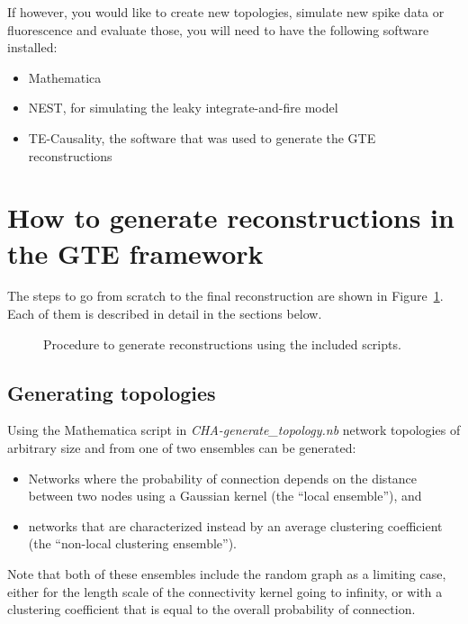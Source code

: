\documentclass[a4paper,11pt]{article}
\begin{document}
If however, you would like to create new topologies, simulate new spike data or fluorescence and evaluate those, you will need to have the following software installed:

\begin{itemize}
  \item Mathematica
  \item NEST, for simulating the leaky integrate-and-fire model~\cite{Gewaltig:NEST}
  \item TE-Causality, the software that was used to generate the GTE reconstructions
\end{itemize}


\section{How to generate reconstructions in the GTE framework}

The steps to go from scratch to the final reconstruction are shown in Figure~\ref{fig:flow_chart_1}. Each of them is described in detail in the sections below.

\begin{figure}
  \begin{center}
    
  \end{center}
  \caption{Procedure to generate reconstructions using the included scripts.}
  \label{fig:flow_chart_1}
\end{figure}


\subsection{Generating topologies}

Using the Mathematica script in \emph{CHA-generate\_topology.nb} network topologies of arbitrary size and from one of two ensembles can be generated:
\begin{itemize}
  \item Networks where the probability of connection depends on the distance between two nodes using a Gaussian kernel (the ``local ensemble''), and
  \item networks that are characterized instead by an average clustering coefficient (the ``non-local clustering ensemble'').
\end{itemize}

Note that both of these ensembles include the random graph as a limiting case, either for the length scale of the connectivity kernel going to infinity, or with a clustering coefficient that is equal to the overall probability of connection.
\end{document}
